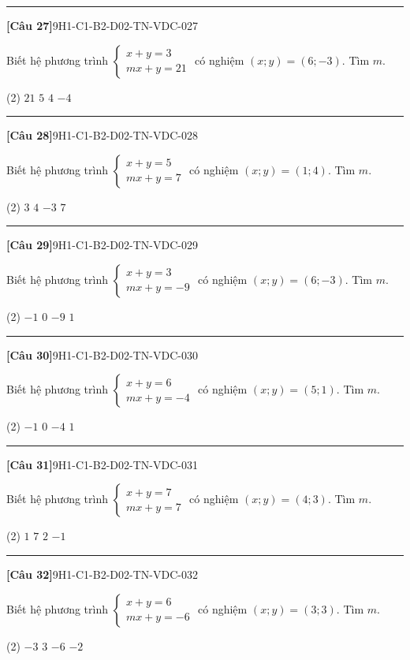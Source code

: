 \documentclass[12pt,a4paper]{article}
\newif\ifloigiai
\newenvironment{cauhoi}[2]{%
  \par\medskip\noindent\rule{\textwidth}{0.4pt}\par\nopagebreak
  \noindent\textbf{[#1]}\hfill{\scriptsize\ttfamily #2}\par\nopagebreak\smallskip}{\par}
\newcommand{\dapan}[1]{\ifloigiai\par\smallskip\noindent\textit{Đáp án:} \textbf{#1}\par\fi}
\begin{document}
\begin{cauhoi}{Câu 27}{9H1-C1-B2-D02-TN-VDC-027}
Biết hệ phương trình $\begin{cases}x+y=3\\ mx+y=21\end{cases}$ có nghiệm $(x;y)=(6;-3)$. Tìm $m$.
\begin{tasks}(2)
\task $21$
\task $5$
\task $4$
\task $-4$
\end{tasks}
\dapan{C}
\end{cauhoi}
\begin{cauhoi}{Câu 28}{9H1-C1-B2-D02-TN-VDC-028}
Biết hệ phương trình $\begin{cases}x+y=5\\ mx+y=7\end{cases}$ có nghiệm $(x;y)=(1;4)$. Tìm $m$.
\begin{tasks}(2)
\task $3$
\task $4$
\task $-3$
\task $7$
\end{tasks}
\dapan{A}
\end{cauhoi}
\begin{cauhoi}{Câu 29}{9H1-C1-B2-D02-TN-VDC-029}
Biết hệ phương trình $\begin{cases}x+y=3\\ mx+y=-9\end{cases}$ có nghiệm $(x;y)=(6;-3)$. Tìm $m$.
\begin{tasks}(2)
\task $-1$
\task $0$
\task $-9$
\task $1$
\end{tasks}
\dapan{A}
\end{cauhoi}
\begin{cauhoi}{Câu 30}{9H1-C1-B2-D02-TN-VDC-030}
Biết hệ phương trình $\begin{cases}x+y=6\\ mx+y=-4\end{cases}$ có nghiệm $(x;y)=(5;1)$. Tìm $m$.
\begin{tasks}(2)
\task $-1$
\task $0$
\task $-4$
\task $1$
\end{tasks}
\dapan{A}
\end{cauhoi}
\begin{cauhoi}{Câu 31}{9H1-C1-B2-D02-TN-VDC-031}
Biết hệ phương trình $\begin{cases}x+y=7\\ mx+y=7\end{cases}$ có nghiệm $(x;y)=(4;3)$. Tìm $m$.
\begin{tasks}(2)
\task $1$
\task $7$
\task $2$
\task $-1$
\end{tasks}
\dapan{A}
\end{cauhoi}
\begin{cauhoi}{Câu 32}{9H1-C1-B2-D02-TN-VDC-032}
Biết hệ phương trình $\begin{cases}x+y=6\\ mx+y=-6\end{cases}$ có nghiệm $(x;y)=(3;3)$. Tìm $m$.
\begin{tasks}(2)
\task $-3$
\task $3$
\task $-6$
\task $-2$
\end{tasks}
\dapan{A}
\end{cauhoi}
\end{document}

